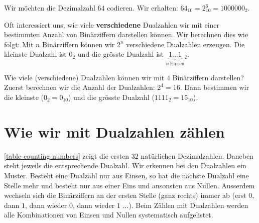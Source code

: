 \begin{example}

Wir möchten die Dezimalzahl $64$ codieren. Wir erhalten: $64_{10} = 2^6_{10} = 1000000_2$.

\end{example}

Oft interessiert uns, wie viele \textbf{verschiedene} Dualzahlen wir mit einer bestimmten Anzahl von Binärziffern darstellen können. Wir berechnen dies wie folgt: Mit $n$ Binärziffern können wir $2^n$ verschiedene Dualzahlen erzeugen. Die kleinste Dualzahl ist $0_2$ und die grösste Dualzahl ist $\underbrace{1\dots1}_{n~\textrm{Einsen}}$$_2$.

\begin{example}
Wie viele (verschiedene) Dualzahlen können wir mit $4$ Binärziffern darstellen? Zuerst berechnen wir die Anzahl der Dualzahlen: $2^4 = 16$. Dann bestimmen wir die kleinste ($0_2 = 0_{10}$) und die grösste Dualzahl ($1111_2 = 15_{10}$).
\end{example}

\section{Wie wir mit Dualzahlen zählen}

\autoref{table-counting-numbers} zeigt die ersten $32$ natürlichen Dezimalzahlen. Daneben steht jeweils die entsprechende Dualzahl. Wir erkennen bei den Dualzahlen ein Muster. Besteht eine Dualzahl nur aus Einsen, so hat die nächste Dualzahl eine Stelle mehr und besteht nur aus einer Eins und ansonsten aus Nullen. Ausserdem wechseln sich die Binärziffern an der ersten Stelle (ganz rechts) immer ab (erst $0$, dann $1$, dann wieder $0$, dann wieder $1$ $\dots$). Beim Zählen mit Dualzahlen werden alle Kombinationen von Einsen und Nullen systematisch aufgelistet.

